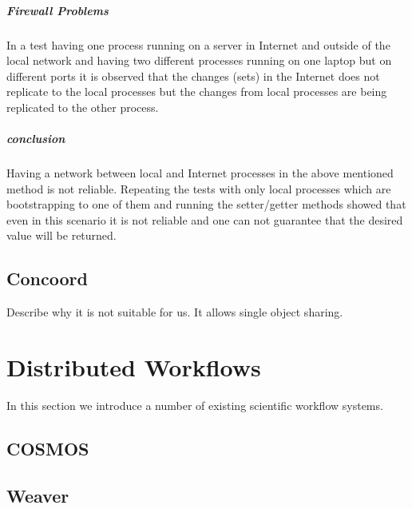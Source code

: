 \subparagraph{Firewall Problems}
In a test having one process running on a server in Internet and outside of the local network and having two
different processes running on one laptop but on different ports it is observed that the changes (sets) in the
Internet does not replicate to the local processes but the changes from local processes are being replicated to the other process.

\subparagraph{conclusion}
Having a network between local and Internet processes in the above mentioned method is not reliable. 
Repeating the tests with only local processes which are bootstrapping to one of them and running the setter/getter
methods showed that even in this scenario it is not reliable and one can not guarantee that the desired value will be returned.


\subsection{Concoord}
Describe why it is not suitable for us. It allows single object sharing.

\section{Distributed Workflows}
In this section we introduce a number of existing scientific workflow systems.
\subsection{COSMOS}\cite{Gafni30062014}
\subsection{Weaver}\cite{Bui_weaver:integrating}